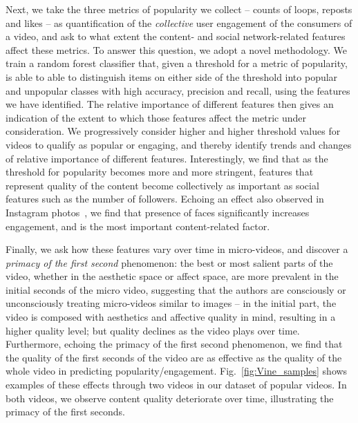 Next, we take the three metrics of popularity we collect -- counts of loops, reposts and likes -- as quantification of the \emph{collective} user engagement of the consumers of a video, and ask to what extent the content- and social network-related features affect these metrics. To answer this question, we adopt a novel methodology.
We train a random forest classifier that, given a threshold for a metric of popularity, is able to able to distinguish items on either side of the threshold into popular and unpopular classes  with high accuracy, precision and recall, using the features we have identified. The relative importance of different features then gives an indication of the extent to which those features affect the metric under consideration. We progressively consider higher and higher threshold values for videos to qualify as popular or engaging, and thereby identify trends and changes of relative importance of different features. Interestingly, we find that as the threshold for popularity becomes more and more stringent, features that represent quality of the content become collectively as important as social features such as the number of followers. Echoing an effect also observed in Instagram photos~\cite{bakhshi2014faces}, we find that presence of faces significantly increases engagement, and is the most important content-related factor.

Finally, we ask how these features vary over time in micro-videos, and discover a \emph{primacy of the first second} phenomenon: the best or most salient parts of the video, whether in the aesthetic space or affect space, are more prevalent in the initial seconds of the micro video, suggesting that the authors are consciously or unconsciously treating micro-videos similar to images -- in the initial part, the video is composed with aesthetics and affective quality in mind, resulting in a higher quality level; but quality declines as the video plays over time. Furthermore, echoing the primacy of the first second phenomenon, we find that the quality of the first seconds of the video are as effective as the quality of the whole video in predicting popularity/engagement. Fig.~\ref{fig:Vine_samples} shows examples of these effects through two videos in our dataset of popular videos. In both videos, we observe content quality deteriorate over time, illustrating the primacy of the first seconds. 
 
